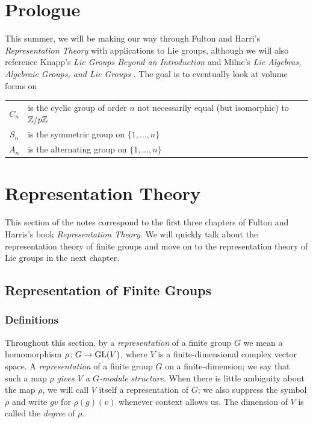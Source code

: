 \chapter{Prologue}
This summer, we will be making our way through Fulton and Harri's
\emph{Representation Theory} with applications to Lie groups, although we
will also reference Knapp's \emph{Lie Groups Beyond an Introduction}
\cite{knapp} and Milne's \emph{Lie Algebras, Algebraic Groups, and Lie
  Groups} \cite{milneLAG}. The goal is to eventually look at volume forms on

\begin{tabular}{cl}
  $C_n$  & is the cyclic group of order $n$ not necessarily equal
           (but isomorphic) to $\mathbb{Z}/p\mathbb{Z}$\\
  $S_n$ & is the symmetric group on $\{1,\dotsc,n\}$\\
  $A_n$ & is the alternating group on $\{1,\dotsc,n\}$\\
\end{tabular}

\newpage
\chapter{Representation Theory}
This section of the notes correspond to the first three chapters of Fulton
and Harris's book \emph{Representation Theory}. We will quickly talk about
the representation theory of finite groups and move on to the
representation theory of Lie groups in the next chapter.
\section{Representation of Finite Groups}
\subsection{Definitions}
Throughout this section, by a \emph{representation} of a finite group $G$
we mean a homomorphism $\rho\colon G\to\mathrm{GL}(V)$, where $V$ is a
finite-dimensional complex vector space. A \emph{representation} of a
finite group $G$ on a finite-dimension; we say that such a map $\rho$
\emph{gives $V$ a $G$-module structure.} When there is little ambiguity
about the map $\rho$, we will call $V$ itself a representation of $G$; we
also suppress the symbol $\rho$ and write $gv$ for $\rho(g)(v)$
whenever context allows us. The dimension of $V$ is called the \emph{degree} of
$\rho$.

